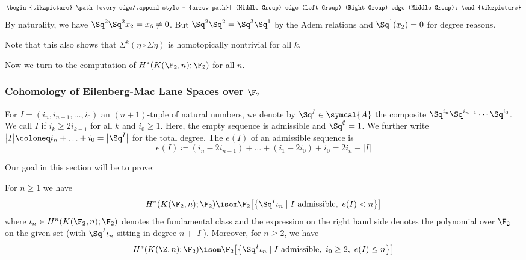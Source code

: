 \begin{example}
\begin{equation*}
\begin{tikzpicture}
			\path[every edge/.append style = {arrow path}]
				(Middle Group) edge (Left Group)
				(Right Group) edge (Middle Group);
		\end{tikzpicture}
	\end{equation*}
	By naturality, we have $\Sq^2 \Sq^2 x_2 = x_6 \neq 0$.
	But $\Sq^2 \Sq^2 = \Sq^3 \Sq^1$ by the Adem relations and $\Sq^1(x_2) = 0$ for degree reasons.

	Note that this also shows that $\Sigma^k(\eta \circ \Sigma \eta)$ is homotopically nontrivial for all $k$.
\end{example}

Now we turn to the computation of $H^*(K(\F_2, n); \F_2)$ for all $n$.
\subsubsection{Cohomology of Eilenberg-Mac Lane Spaces over \texorpdfstring{$\F_2$}{F2}}
\begin{definition}
	For $I = (i_n, i_{n - 1}, \ldots, i_0)$ an $(n + 1)$-tuple of natural numbers, we denote by $\Sq^I \in \symcal{A}$ the composite $\Sq^{i_n} \Sq^{i_{n - 1}} \cdots \Sq^{i_0}$.
	We call $I$  if $i_k \geq 2 i_{k - 1}$ for all $k$ and $i_0 \geq 1$.
	Here, the empty sequence is admissible and $\Sq^{\emptyset} = 1$.
	We further write $\big|I\big| \coloneq i_n + \ldots + i_0 = \big|\Sq^I\big|$ for the total degree.
	The  $e(I)$ of an admissible sequence is 
	\begin{equation*}
		e(I) \coloneq (i_n - 2 i_{n - 1}) + \ldots + (i_1 - 2 i_0) + i_0 = 2 i_n - \big|I\big|
	\end{equation*}
\end{definition}
Our goal in this section will be to prove:
\begin{theorem}\label{thm:cartanserre}
	For $n \geq 1$ we have 
	\begin{equation*}
		H^*(K(\F_2, n); \F_2) \isom \F_2\big[\big\{\Sq^I \iota_n \mid I \text{ admissible},\ e(I) < n\big\}\big]
	\end{equation*}
	where $\iota_n \in H^n(K(\F_2, n); \F_2)$ denotes the fundamental class and the expression on the right hand side denotes the polynomial over $\F_2$ on the given set (with $\Sq^I \iota_n$ sitting in degree $n + \big|I\big|$).
	Moreover, for $n \geq 2$, we have 
	\begin{equation*}
		H^*(K(\Z, n); \F_2) \isom \F_2\big[\big\{\Sq^I \iota_n \mid I \text{ admissible},\ i_0 \geq 2,\ e(I) \leq n\big\}\big]
	\end{equation*}
\end{theorem}
